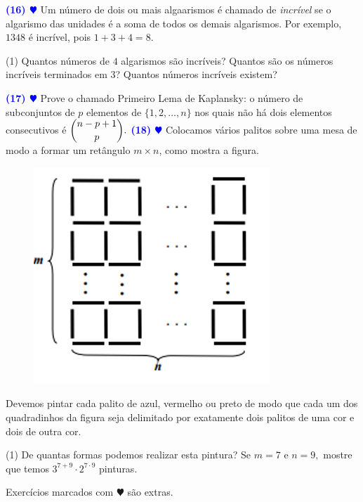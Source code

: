 \documentclass[12pt, a4paper]{article}
\newcommand{\negrito}[1]{\mbox{\boldmath{$#1$}}}
\begin{document}
\textcolor{blue}{\bf(16) $\varheart$} Um número de dois ou mais algaarismos é chamado de \textit{incrível} se o algarismo das unidades é a soma de todos os demais algarismos. Por exemplo, $1348$ é incrível, pois $1 + 3 + 4 = 8.$
\begin{tasks}[counter-format={(tsk[a])},label-width=3.6ex, label-format = {\bfseries}, column-sep = {0pt}](1)
\task[\textcolor{Floresta}{$\negrito{(a)} $}] Quantos números de $4$ algarismos são incríveis? 
\task[\textcolor{Floresta}{$\negrito{(b)} $}] Quantos são os números incríveis terminados em 3?
\task[\textcolor{Floresta}{$\negrito{(c)} $}] Quantos números incríveis existem?
\end{tasks}
\textcolor{blue}{\bf(17) $\varheart$} Prove o chamado Primeiro Lema de Kaplansky: o número de subconjuntos de $p$ elementos de $\{1, 2, \ldots, n \}$ nos quais não há dois elementos consecutivos é $\dbinom{n-p+1}{p}.$ 
\newline\newline
\textcolor{blue}{\bf(18) $\varheart$} Colocamos vários palitos sobre uma mesa de modo a formar um retângulo $m \times n$, como mostra a figura.
\begin{figure}[!h]
    \centering
    \includegraphics{Figuras/Palitos.png}
\end{figure}

Devemos pintar cada palito de azul, vermelho ou preto de modo que cada um dos quadradinhos da figura seja delimitado por exatamente dois palitos de uma cor e dois de outra cor. 
\begin{tasks}[counter-format={(tsk[a])},label-width=3.6ex, label-format = {\bfseries}, column-sep = {0pt}](1)
\task[\textcolor{Floresta}{$\negrito{(a)} $}] De quantas formas podemos realizar esta pintura?
\task[\textcolor{Floresta}{$\negrito{(b)} $}] Se $m = 7$ e $n = 9,$ mostre que temos $3^{7 + 9} \cdot 2^{7 \cdot 9}$ pinturas. 
\end{tasks}

Exercícios marcados com $\varheart$ são extras.
\end{document}
